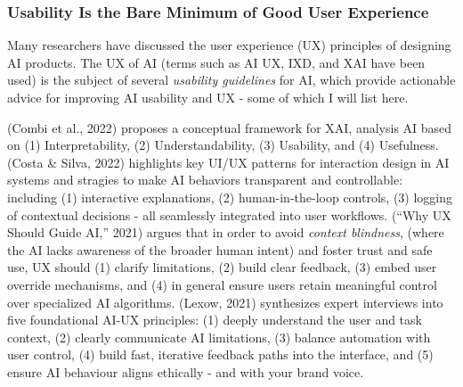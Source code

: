 \documentclass[
  letterpaper,
  DIV=11,
  numbers=noendperiod]{scrartcl}
\begin{document}
\subsubsection{Usability Is the Bare Minimum of Good User
Experience}\label{usability-is-the-bare-minimum-of-good-user-experience}

Many researchers have discussed the user experience (UX) principles of
designing AI products. The UX of AI (terms such as AI UX, IXD, and XAI
have been used) is the subject of several \emph{usability guidelines}
for AI, which provide actionable advice for improving AI usability and
UX - some of which I will list here.

(Combi et al., 2022) proposes a conceptual framework for XAI, analysis
AI based on (1) Interpretability, (2) Understandability, (3) Usability,
and (4) Usefulness. (Costa \& Silva, 2022) highlights key UI/UX patterns
for interaction design in AI systems and stragies to make AI behaviors
transparent and controllable: including (1) interactive explanations,
(2) human-in-the-loop controls, (3) logging of contextual decisions -
all seamlessly integrated into user workflows. ({``Why {UX} Should Guide
{AI},''} 2021) argues that in order to avoid \emph{context blindness},
(where the AI lacks awareness of the broader human intent) and foster
trust and safe use, UX should (1) clarify limitations, (2) build clear
feedback, (3) embed user override mechanisms, and (4) in general ensure
users retain meaningful control over specialized AI algorithms. (Lexow,
2021) synthesizes expert interviews into five foundational AI-UX
principles: (1) deeply understand the user and task context, (2) clearly
communicate AI limitations, (3) balance automation with user control,
(4) build fast, iterative feedback paths into the interface, and (5)
ensure AI behaviour aligns ethically - and with your brand voice.
\end{document}
